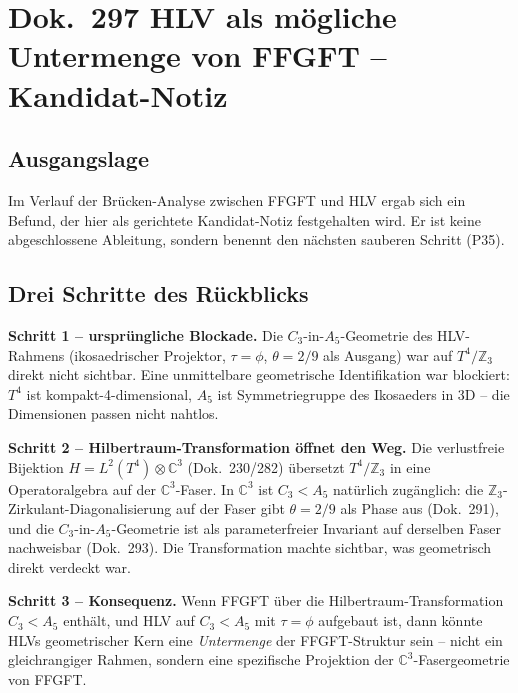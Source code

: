 
\section*{Dok.~297 \quad HLV als mögliche Untermenge von FFGFT --
Kandidat-Notiz}

\subsection*{Ausgangslage}

Im Verlauf der Brücken-Analyse zwischen FFGFT und HLV ergab sich ein
Befund, der hier als gerichtete Kandidat-Notiz festgehalten wird. Er
ist keine abgeschlossene Ableitung, sondern benennt den nächsten
sauberen Schritt (P35).

\subsection*{Drei Schritte des Rückblicks}

\textbf{Schritt 1 -- ursprüngliche Blockade.} Die $C_3$-in-$A_5$-Geometrie
des HLV-Rahmens (ikosaedrischer Projektor, $\tau = \phi$, $\theta = 2/9$
als Ausgang) war auf $T^4/\mathbb{Z}_3$ direkt nicht sichtbar. Eine
unmittelbare geometrische Identifikation war blockiert: $T^4$ ist
kompakt-4-dimensional, $A_5$ ist Symmetriegruppe des Ikosaeders in 3D --
die Dimensionen passen nicht nahtlos.

\textbf{Schritt 2 -- Hilbertraum-Transformation öffnet den Weg.} Die
verlustfreie Bijektion $H = L^2(T^4)\otimes\mathbb{C}^3$
(Dok.~230/282) übersetzt $T^4/\mathbb{Z}_3$ in eine Operatoralgebra auf
der $\mathbb{C}^3$-Faser. In $\mathbb{C}^3$ ist $C_3 < A_5$ natürlich
zugänglich: die $\mathbb{Z}_3$-Zirkulant-Diagonalisierung auf der Faser
gibt $\theta = 2/9$ als Phase aus (Dok.~291), und die
$C_3$-in-$A_5$-Geometrie ist als parameterfreier Invariant auf derselben
Faser nachweisbar (Dok.~293). Die Transformation machte sichtbar, was
geometrisch direkt verdeckt war.

\textbf{Schritt 3 -- Konsequenz.} Wenn FFGFT über die
Hilbertraum-Transformation $C_3 < A_5$ enthält, und HLV auf $C_3 < A_5$
mit $\tau = \phi$ aufgebaut ist, dann könnte HLVs geometrischer Kern eine
\emph{Untermenge} der FFGFT-Struktur sein -- nicht ein gleichrangiger
Rahmen, sondern eine spezifische Projektion der $\mathbb{C}^3$-Fasergeometrie
von FFGFT.

